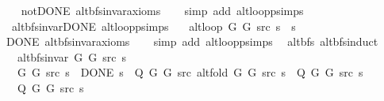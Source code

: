 \begin{isabellebody}
\ \ %
\endisadelimproof
%
\isatagproof
{}\isamarkupfalse%
\ not{\isacharunderscore}{\kern0pt}DONE\ alt{\isacharunderscore}{\kern0pt}bfs{\isacharunderscore}{\kern0pt}invar{\isacharunderscore}{\kern0pt}axioms\isanewline
\ \ \isamarkupfalse%
\ {\isacharparenleft}{\kern0pt}simp\ add{\isacharcolon}{\kern0pt}\ alt{\isacharunderscore}{\kern0pt}loop{\isacharunderscore}{\kern0pt}psimps{\isacharparenright}{\kern0pt}%
\endisatagproof
{\isafoldproof}%
%
\isadelimproof
\isanewline
%
\endisadelimproof
\isanewline
{}\isamarkupfalse%
\ {\isacharparenleft}{\kern0pt}\ alt{\isacharunderscore}{\kern0pt}bfs{\isacharunderscore}{\kern0pt}invar{\isacharunderscore}{\kern0pt}DONE{\isacharparenright}{\kern0pt}\ alt{\isacharunderscore}{\kern0pt}loop{\isacharunderscore}{\kern0pt}psimps{\isacharcolon}{\kern0pt}\isanewline
\ \ \ {\isachardoublequoteopen}alt{\isacharunderscore}{\kern0pt}loop\ G{}\ G{}\ src\ s\ {\isacharequal}{\kern0pt}\ s{\isachardoublequoteclose}\isanewline
%
\isadelimproof
\ \ %
\endisadelimproof
%
\isatagproof
{}\isamarkupfalse%
\ DONE\ alt{\isacharunderscore}{\kern0pt}bfs{\isacharunderscore}{\kern0pt}invar{\isacharunderscore}{\kern0pt}axioms\isanewline
\ \ \isamarkupfalse%
\ {\isacharparenleft}{\kern0pt}simp\ add{\isacharcolon}{\kern0pt}\ alt{\isacharunderscore}{\kern0pt}loop{\isacharunderscore}{\kern0pt}psimps{\isacharparenright}{\kern0pt}%
\endisatagproof
{\isafoldproof}%
%
\isadelimproof
\isanewline
%
\endisadelimproof
\isanewline
{}\isamarkupfalse%
\ {\isacharparenleft}{\kern0pt}\ alt{\isacharunderscore}{\kern0pt}bfs{\isacharparenright}{\kern0pt}\ alt{\isacharunderscore}{\kern0pt}bfs{\isacharunderscore}{\kern0pt}induct{\isacharcolon}{\kern0pt}\isanewline
\ \ \ {\isachardoublequoteopen}alt{\isacharunderscore}{\kern0pt}bfs{\isacharunderscore}{\kern0pt}invar{\isacharprime}{\kern0pt}\ G{}\ G{}\ src\ s{\isachardoublequoteclose}\isanewline
\ \ \ {\isachardoublequoteopen}{\isasymAnd}G{}\ G{}\ src\ s{\isachardot}{\kern0pt}\ {\isacharparenleft}{\kern0pt}{\isasymnot}\ DONE\ s\ {\isasymLongrightarrow}\ Q\ G{}\ G{}\ src\ {\isacharparenleft}{\kern0pt}alt{\isacharunderscore}{\kern0pt}fold\ G{}\ G{}\ src\ s{\isacharparenright}{\kern0pt}{\isacharparenright}{\kern0pt}\ {\isasymLongrightarrow}\ Q\ G{}\ G{}\ src\ s{\isachardoublequoteclose}\isanewline
\ \ \ {\isachardoublequoteopen}Q\ G{}\ G{}\ src\ s{\isachardoublequoteclose}\isanewline

\end{isabellebody}
